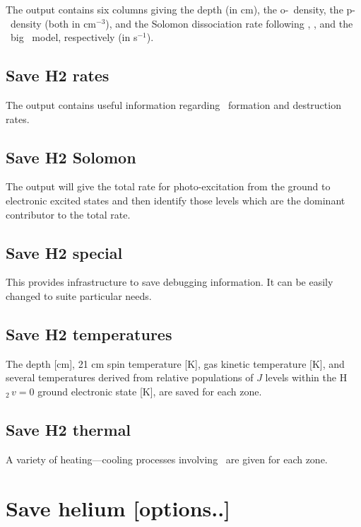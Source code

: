 The output contains six columns giving the depth (in cm), the
o-\htwo\ density, the p-\htwo\ density (both in cm$^{-3}$), and the Solomon
dissociation rate following \citet{Tielens1985a}, \citet{Bertoldi1996}, and
the \Cloudy\ big \htwo\ model, respectively (in s$^{-1}$).

\subsection{Save H2 rates}

The output contains useful information regarding \htwo\ formation and
destruction rates.

\subsection{Save H2 Solomon}

The output will give the total rate for photo-excitation from the ground
to electronic excited states and then identify those levels which are the
dominant contributor to the total rate.

\subsection{Save H2 special}

This provides infrastructure to save debugging information.  It can
be easily changed to suite particular needs.

\subsection{Save H2 temperatures}

The depth [cm], 21 cm spin temperature [K], gas kinetic temperature [K],
and several temperatures derived from relative populations of $J$ levels within
the H$_2\, v=0$ ground  electronic state [K], are saved for each zone.

\subsection{Save H2 thermal}

A variety of heating---cooling processes involving \htwo\ are given
for each zone.

\section{Save helium [options..]}

